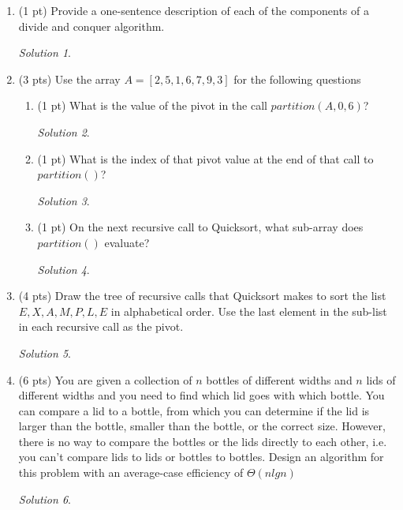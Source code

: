 \documentclass[12pt]{article}
\theoremstyle{remark}
\newtheorem*{solution}{Solution}
\begin{document}
\hrulefill
\pagebreak

\begin{enumerate}

    \item (1 pt) Provide a one-sentence description of each of the components of a divide and conquer algorithm.
    
    \begin{solution}
    
    \end{solution}
    
    \item (3 pts) Use the array $A=[2,5,1,6,7,9,3]$ for the following questions
    \begin{enumerate}
        \item (1 pt) What is the value of the pivot in the call $partition(A,0,6)$?
        
        \begin{solution}
        
        \end{solution}
        
        \item (1 pt) What is the index of that pivot value at the end of that call to $partition()$?
        
        \begin{solution}
        
        \end{solution}
        
        \item (1 pt) On the next recursive call to Quicksort, what sub-array does $partition()$ evaluate?
        
        \begin{solution}
        
        \end{solution}
        
    \end{enumerate}
	\item (4 pts) Draw the tree of recursive calls that Quicksort makes to sort the list \\${E,X,A,M,P,L,E}$ in alphabetical order. Use the last element in the sub-list in each recursive call as the pivot.
	
	\begin{solution}
        
    \end{solution}
	

    \item (6 pts) You are given a collection of $n$ bottles of different widths and $n$ lids of different widths and you need to find which lid goes with which bottle. You can compare a lid to a bottle, from which you can determine if the lid is larger than the bottle, smaller than the bottle, or the correct size. However, there is no way to compare the bottles or the lids directly to each other, i.e. you can't compare lids to lids or bottles to bottles. Design an algorithm for this problem with an average-case efficiency of $\Theta(nlgn)$
    
    \begin{solution}
        
    \end{solution}
    
\end{enumerate}
\end{document}
